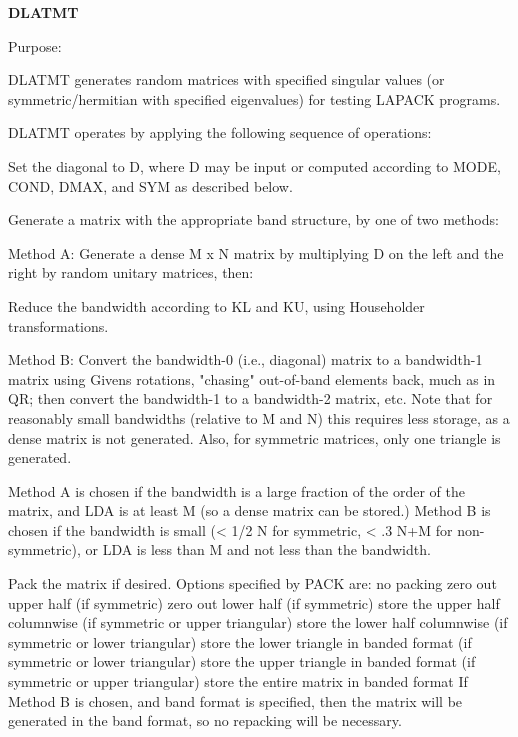 {\bfseries D\+L\+A\+T\+M\+T} 

\begin{DoxyParagraph}{Purpose\+: }
\begin{DoxyVerb}    DLATMT generates random matrices with specified singular values
    (or symmetric/hermitian with specified eigenvalues)
    for testing LAPACK programs.

    DLATMT operates by applying the following sequence of
    operations:

      Set the diagonal to D, where D may be input or
         computed according to MODE, COND, DMAX, and SYM
         as described below.

      Generate a matrix with the appropriate band structure, by one
         of two methods:

      Method A:
          Generate a dense M x N matrix by multiplying D on the left
              and the right by random unitary matrices, then:

          Reduce the bandwidth according to KL and KU, using
          Householder transformations.

      Method B:
          Convert the bandwidth-0 (i.e., diagonal) matrix to a
              bandwidth-1 matrix using Givens rotations, "chasing"
              out-of-band elements back, much as in QR; then
              convert the bandwidth-1 to a bandwidth-2 matrix, etc.
              Note that for reasonably small bandwidths (relative to
              M and N) this requires less storage, as a dense matrix
              is not generated.  Also, for symmetric matrices, only
              one triangle is generated.

      Method A is chosen if the bandwidth is a large fraction of the
          order of the matrix, and LDA is at least M (so a dense
          matrix can be stored.)  Method B is chosen if the bandwidth
          is small (< 1/2 N for symmetric, < .3 N+M for
          non-symmetric), or LDA is less than M and not less than the
          bandwidth.

      Pack the matrix if desired. Options specified by PACK are:
         no packing
         zero out upper half (if symmetric)
         zero out lower half (if symmetric)
         store the upper half columnwise (if symmetric or upper
               triangular)
         store the lower half columnwise (if symmetric or lower
               triangular)
         store the lower triangle in banded format (if symmetric
               or lower triangular)
         store the upper triangle in banded format (if symmetric
               or upper triangular)
         store the entire matrix in banded format
      If Method B is chosen, and band format is specified, then the
         matrix will be generated in the band format, so no repacking
         will be necessary.\end{DoxyVerb}
 
\end{DoxyParagraph}

